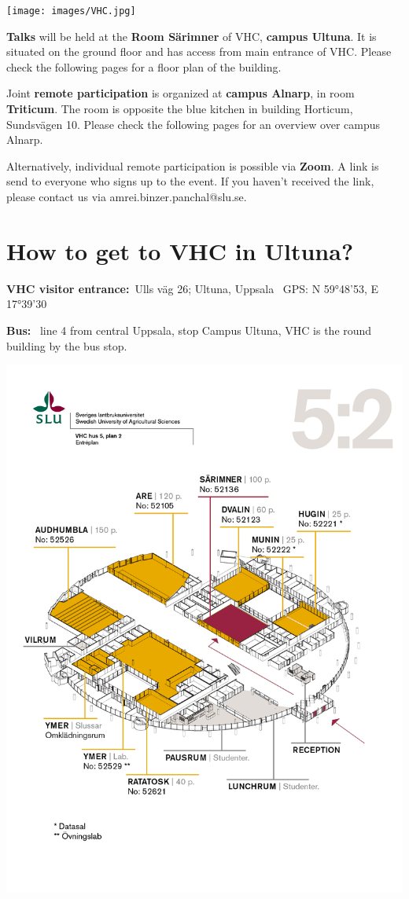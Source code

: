 \begin{center}
\texttt{[image: images/VHC.jpg]}
\end{center}

\textbf{Talks} will be held at the \textbf{Room S\"arimner} of VHC, \textbf{campus Ultuna}. It is situated on the ground floor and
has access from main entrance of VHC. Please check the following pages for a floor plan of the building. \

Joint \textbf{remote participation} is organized at \textbf{campus Alnarp}, in room \textbf{Triticum}. The room is opposite the blue kitchen in building Horticum, Sundsvägen 10. Please check the following pages for an overview over campus Alnarp. \

Alternatively, individual remote participation is possible via \textbf{Zoom}. A link is send to everyone who signs up to the event. If you haven't received the link, please contact us via amrei.binzer.panchal@slu.se. 
 
\section{How to get to VHC in Ultuna?}

 \textbf{VHC visitor entrance:}\
Ulls väg 26; Ultuna, Uppsala \
GPS: N 59°48'53, E 17°39'30


 \textbf{Bus:} \
 line 4 from central Uppsala, stop Campus Ultuna, VHC is the round building by the bus stop. 


\begin{center}
\includegraphics[width=0.8\linewidth]{images/planskiss_vhc_52.png}
\end{center}


